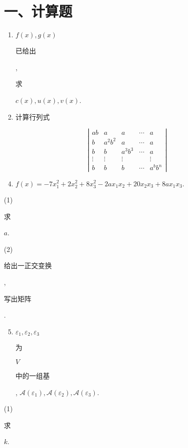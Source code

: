 \documentclass[10pt]{article}
\begin{document}
\section{一、计算题}
\begin{enumerate}
  \item $f(x), g(x)$ \begin{CJK}{UTF8}{mj}已给出\end{CJK}, \begin{CJK}{UTF8}{mj}求\end{CJK} $c(x), u(x), v(x)$.

  \item \begin{CJK}{UTF8}{mj}计算行列式\end{CJK}

\end{enumerate}
$$
\left|\begin{array}{ccccc}
a b & a & a & \cdots & a \\
b & a^{2} b^{2} & a & \cdots & a \\
b & b & a^{3} b^{3} & \cdots & a \\
\vdots & \vdots & \vdots & & \vdots \\
b & b & b & \cdots & a^{b} b^{n}
\end{array}\right|
$$

\begin{enumerate}
  \setcounter{enumi}{3}
  \item $f(x)=-7 x_{1}^{2}+2 x_{2}^{2}+8 x_{3}^{2}-2 a x_{1} x_{2}+20 x_{2} x_{3}+8 a x_{1} x_{3}$.
\end{enumerate}
(1) \begin{CJK}{UTF8}{mj}求\end{CJK} $a$.

(2) \begin{CJK}{UTF8}{mj}给出一正交变换\end{CJK}, \begin{CJK}{UTF8}{mj}写出矩阵\end{CJK}.

\begin{enumerate}
  \setcounter{enumi}{4}
  \item $\varepsilon_{1}, \varepsilon_{2}, \varepsilon_{3}$ \begin{CJK}{UTF8}{mj}为\end{CJK} $V$ \begin{CJK}{UTF8}{mj}中的一组基\end{CJK}, $\mathscr{A}\left(\varepsilon_{1}\right), \mathscr{A}\left(\varepsilon_{2}\right), \mathscr{A}\left(\varepsilon_{3}\right)$.
\end{enumerate}
(1) \begin{CJK}{UTF8}{mj}求\end{CJK} $k$.
\end{document}
